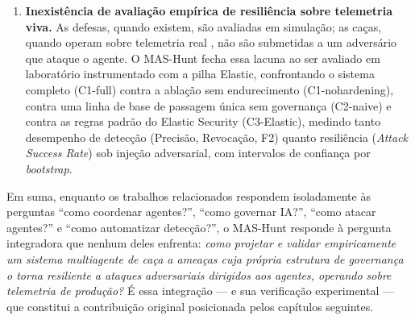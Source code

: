 \begin{enumerate}
    \item \textbf{Inexistência de avaliação empírica de resiliência sobre telemetria
    viva.} As defesas, quando existem, são avaliadas em simulação; as caças, quando
    operam sobre telemetria real \cite{ali2023huntgptintegratingmachinelearningbased},
    não são submetidas a um adversário que ataque o agente. O MAS-Hunt fecha essa
    lacuna ao ser avaliado em laboratório instrumentado com a pilha Elastic,
    confrontando o sistema completo (C1-full) contra a ablação sem endurecimento
    (C1-nohardening), contra uma linha de base de passagem única sem governança
    (C2-naive) e contra as regras padrão do Elastic Security (C3-Elastic), medindo
    tanto desempenho de detecção (Precisão, Revocação, F2) quanto resiliência
    (\textit{Attack Success Rate}) sob injeção adversarial, com intervalos de
    confiança por \textit{bootstrap}.
\end{enumerate}

Em suma, enquanto os trabalhos relacionados respondem isoladamente às perguntas
``como coordenar agentes?'', ``como governar IA?'', ``como atacar agentes?'' e
``como automatizar detecção?'', o MAS-Hunt responde à pergunta integradora que
nenhum deles enfrenta: \textit{como projetar e validar empiricamente um sistema
multiagente de caça a ameaças cuja própria estrutura de governança o torna
resiliente a ataques adversariais dirigidos aos agentes, operando sobre telemetria
de produção?} É essa integração --- e sua verificação experimental --- que
constitui a contribuição original posicionada pelos capítulos seguintes.
